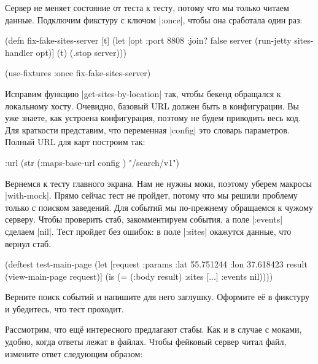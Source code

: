 Сервер не меняет состояние от теста к тесту, потому что мы только читаем
данные. Подключим фикстуру с ключом \spverb|:once|, чтобы она сработала один
раз:

\begin{english}
  \begin{clojure}
(defn fix-fake-sites-server [t]
  (let [opt {:port 8808 :join? false}
        server (run-jetty sites-handler opt)]
    (t)
    (.stop server)))

(use-fixtures :once fix-fake-sites-server)
  \end{clojure}
\end{english}


Исправим функцию \spverb|get-sites-by-location| так, чтобы бекенд обращался к
локальному хосту. Очевидно, базовый URL должен быть в конфигурации. Вы уже
знаете, как устроена конфигурация, поэтому не будем приводить весь код. Для
краткости представим, что переменная \spverb|config| это словарь
параметров. Полный URL для карт построим так:

\begin{english}
  \begin{clojure}
{:url (str (:maps-base-url config ) "/search/v1")}
  \end{clojure}
\end{english}

Вернемся к тесту главного экрана. Нам не нужны моки, поэтому уберем макросы
\spverb|with-mock|. Прямо сейчас тест не пройдет, потому что мы решили проблему
только с поиском заведений. Для событий мы по-прежнему обращаемся к чужому
серверу. Чтобы проверить стаб, закомментируем события, а поле \spverb|:events|
сделаем \spverb|nil|. Тест пройдет без ошибок: в поле \spverb|:sites| окажутся
данные, что вернул стаб.

\begin{english}
  \begin{clojure}
(deftest test-main-page
  (let [request {:params {:lat 55.751244
                          :lon 37.618423}}
        result (view-main-page request)]
    (is (= (:body result) {:sites [...] :events nil}))))
  \end{clojure}
\end{english}

Верните поиск событий и напишите для него заглушку. Оформите её в фикстуру и
убедитесь, что тест проходит.

Рассмотрим, что ещё интересного предлагают стабы. Как и в случае с моками,
удобно, когда ответы лежат в файлах. Чтобы фейковый сервер читал файл, измените
ответ следующим образом:

